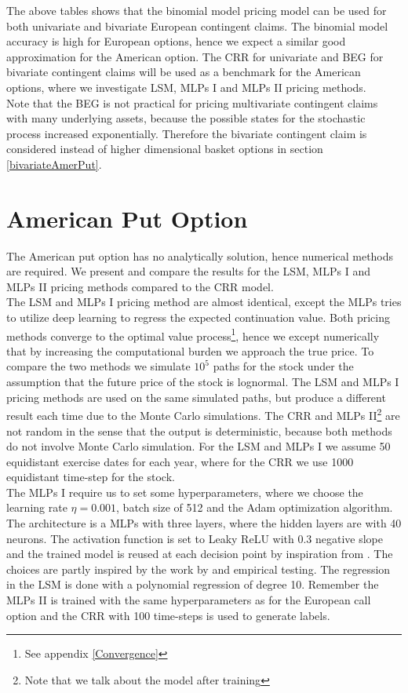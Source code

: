 The above tables shows that the binomial model pricing model can be used for both univariate and bivariate European contingent claims. The binomial model accuracy is high for European options, hence we expect a similar good approximation for the American option. The CRR for univariate and BEG for bivariate contingent claims will be used as a benchmark for the American options, where we investigate LSM, MLPs I and MLPs II pricing methods. \\

Note that the BEG is not practical for pricing multivariate contingent claims with many underlying assets, because the possible states for the stochastic process increased exponentially. Therefore the bivariate contingent claim is considered instead of higher dimensional basket options in section \ref{bivariateAmerPut}.
\section{American Put Option}
The American put option has no analytically solution, hence numerical methods are required. We present and compare the results for the LSM, MLPs I and MLPs II pricing methods compared to the CRR model.\\

The LSM and MLPs I pricing method are almost identical, except the MLPs tries to utilize deep learning to regress the expected continuation value. Both pricing methods converge to the optimal value process\footnote{See appendix \ref{Convergence}}, hence we except numerically that by increasing the computational burden we approach the true price. To compare the two methods we simulate $10^5$ paths for the stock under the assumption that the future price of the stock is lognormal. The LSM and MLPs I pricing methods are used on the same simulated paths, but produce a different result each time due to the Monte Carlo simulations. The CRR and MLPs II\footnote{Note that we talk about the model after training} are not random in the sense that the output is deterministic, because both methods do not involve Monte Carlo simulation. For the LSM and MLPs I we assume 50 equidistant exercise dates for each year, where for the CRR we use 1000 equidistant time-step for the stock.  \\

The MLPs I require us to set some hyperparameters, where we choose the learning rate $\eta=0.001$, batch size of 512 and the Adam optimization algorithm. The architecture is a MLPs with three layers, where the hidden layers are with 40 neurons. The activation function is set to Leaky ReLU with 0.3 negative slope and the trained model is reused at each decision point by inspiration from \parencite{Lelong19}. The choices are partly inspired by the work by \parencite{Lelong19} and empirical testing. The regression in the LSM is done with a polynomial regression of degree 10. Remember the MLPs II is trained with the same hyperparameters as for the European call option and the CRR with 100 time-steps is used to generate labels.\\

